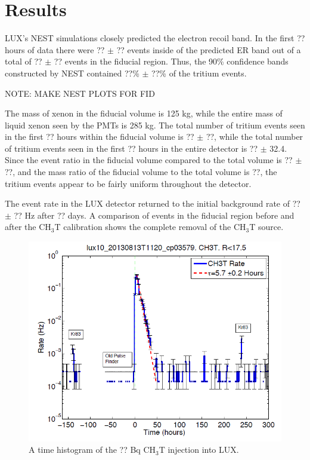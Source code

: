 \section{Results}


LUX's NEST simulations closely predicted the electron recoil band.  In the first ?? hours of data there were ?? $\pm$ ?? events inside of the predicted ER band out of a total of ?? $\pm$ ?? events in the fiducial region.  Thus, the 90\% confidence bands constructed by NEST contained ??\% $\pm$ ??\% of the tritium events.  

NOTE: MAKE NEST PLOTS FOR FID

The mass of xenon in the fiducial volume is 125 kg, while the entire mass of liquid xenon seen by the PMTs is 285 kg.  The total number of tritium events seen in the first ?? hours within the fiducial volume is ?? $\pm$ ??, while the total number of tritium events seen in the first ?? hours in the entire detector is ?? $\pm$ 32.4.  Since the event ratio in the fiducial volume compared to the total volume is ?? $\pm$ ??, and the mass ratio of the fiducial volume to the total volume is ??, the tritium events appear to be fairly uniform throughout the detector.

The event rate in the LUX detector returned to the initial background rate of ?? $\pm$ ?? Hz after ?? days.  A comparison of events in the fiducial region before and after the CH$_3$T calibration shows the complete removal of the CH$_3$T source.

\begin{figure}[h]
\centering
\includegraphics[scale=0.25]{LUXTimeHisto.png}
\caption{A time histogram of the ?? Bq CH$_3$T injection into LUX.}
\label{fig:TimeHisto}
\end{figure}

